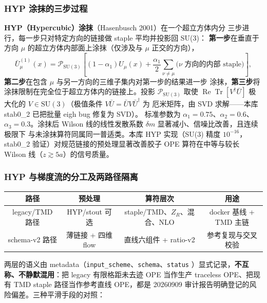 \documentclass[11pt,a4paper]{ctexart}
\newcommand{\code}[1]{\texttt{#1}}
\begin{document}
\subsubsection{HYP 涂抹的三步过程}

\textbf{HYP（Hypercubic）涂抹}（Hasenbusch 2001）在一个超立方体内分
三步进行，每一步只对特定方向的链接做 staple 平均并投影回 SU(3)：
\textbf{第一步}在垂直于方向 $\mu$ 的超立方体内部面上涂抹（仅涉及与
$\mu$ 正交的方向），
\begin{equation}
\bar U_\mu^{(1)}(x) = \mathcal P_{\mathrm{SU(3)}}\!\left[
(1-\alpha_1)U_\mu(x) + \frac{\alpha_1}{2}
\sum_{\nu\ne\mu} \bigl(\text{$\nu$ 方向的内部 staple}\bigr) \right],
\end{equation}
\textbf{第二步}在包含 $\mu$ 与另一方向的三维子集内对第一步的结果进一步
涂抹，\textbf{第三步}将涂抹限制在完全位于超立方体内的链接上。投影
$\mathcal P_{\mathrm{SU(3)}}$ 取使
$\operatorname{Re}\operatorname{Tr}[V^\dagger\bar U]$ 极大化的
$V\in\mathrm{SU}(3)$（极值条件 $V\bar U=\bar U V\bar U^\dagger$ 为
厄米矩阵，由 SVD 求解——本库 stab0\_2 已把批量 eigh bug 修复为 SVD）。
标准参数为 $\alpha_1=0.75$、$\alpha_2=0.6$、$\alpha_3=0.3$。涂抹后
Wilson 线的线性发散系数 $\delta m$ 显著减小、信噪比改善，且连续极限下
与未涂抹算符同属同一普适类。本库 HYP 实现（SU(3) 精度 $10^{-16}$，
stab0\_2 验证）对规范链接的预处理显著改善胶子 OPE 算符在中等与较长
Wilson 线（$z\gtrsim5a$）的信号质量。

\subsubsection{HYP 与梯度流的分工及两路径隔离}

\begin{center}
\small
\begin{tabular}{c c c c}
\toprule
\textbf{路径} & \textbf{预处理} & \textbf{算符层次} & \textbf{用途} \\
\midrule
legacy/TMD 路径 & HYP/stout 可选 & staple/TMD、$Z_R$、混合、NLO & docker 基线 + TMD 主链 \\
schema-v2 路径 & 薄链接 + 四维 flow & 直线六组件 + ratio-v2 & 参考复现与交叉校验 \\
\bottomrule
\end{tabular}
\end{center}
两层的语义由 metadata（\code{input\_scheme}、\code{schema}、\code{status}
）显式记录，\textbf{不互称、不静默混用}：把 legacy 有限格距未去迹 OPE
当作生产 traceless OPE、把现有 TMD staple 路径当作参考直线 OPE，都是
20260909 审计报告明确登记的风险偏差。三种平滑手段的对照：
\end{document}
